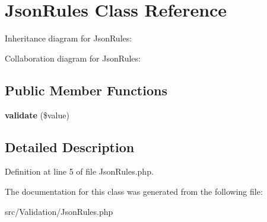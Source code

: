 \hypertarget{class_zest_1_1_validation_1_1_json_rules}{}\section{Json\+Rules Class Reference}
\label{class_zest_1_1_validation_1_1_json_rules}


Inheritance diagram for Json\+Rules\+:


Collaboration diagram for Json\+Rules\+:
\subsection*{Public Member Functions}
\begin{DoxyCompactItemize}
\item 
\mbox{\label{class_zest_1_1_validation_1_1_json_rules_a513c2ce0a04f9dee65dc4c77451a38cf}} 
{\bfseries validate} (\$value)
\end{DoxyCompactItemize}


\subsection{Detailed Description}


Definition at line 5 of file Json\+Rules.\+php.



The documentation for this class was generated from the following file\+:\begin{DoxyCompactItemize}
\item 
src/\+Validation/Json\+Rules.\+php\end{DoxyCompactItemize}

